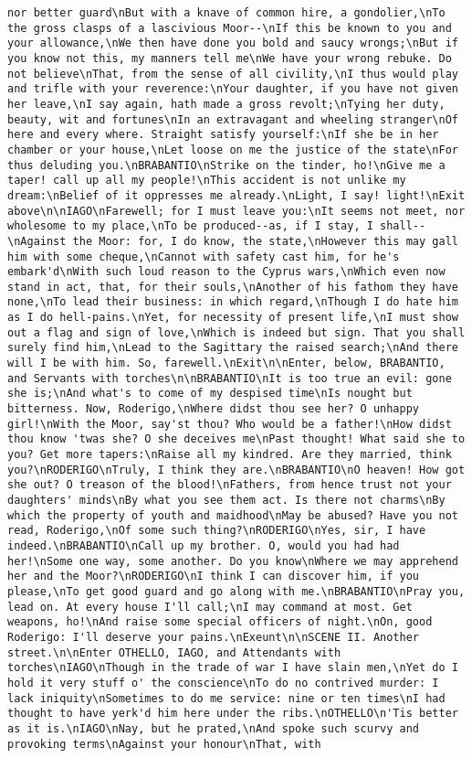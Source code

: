 \begin{verbatim}
nor better guard\nBut with a knave of common hire, a gondolier,\nTo the gross clasps of a lascivious Moor--\nIf this be known to you and your allowance,\nWe then have done you bold and saucy wrongs;\nBut if you know not this, my manners tell me\nWe have your wrong rebuke. Do not believe\nThat, from the sense of all civility,\nI thus would play and trifle with your reverence:\nYour daughter, if you have not given her leave,\nI say again, hath made a gross revolt;\nTying her duty, beauty, wit and fortunes\nIn an extravagant and wheeling stranger\nOf here and every where. Straight satisfy yourself:\nIf she be in her chamber or your house,\nLet loose on me the justice of the state\nFor thus deluding you.\nBRABANTIO\nStrike on the tinder, ho!\nGive me a taper! call up all my people!\nThis accident is not unlike my dream:\nBelief of it oppresses me already.\nLight, I say! light!\nExit above\n\nIAGO\nFarewell; for I must leave you:\nIt seems not meet, nor wholesome to my place,\nTo be produced--as, if I stay, I shall--\nAgainst the Moor: for, I do know, the state,\nHowever this may gall him with some cheque,\nCannot with safety cast him, for he's embark'd\nWith such loud reason to the Cyprus wars,\nWhich even now stand in act, that, for their souls,\nAnother of his fathom they have none,\nTo lead their business: in which regard,\nThough I do hate him as I do hell-pains.\nYet, for necessity of present life,\nI must show out a flag and sign of love,\nWhich is indeed but sign. That you shall surely find him,\nLead to the Sagittary the raised search;\nAnd there will I be with him. So, farewell.\nExit\n\nEnter, below, BRABANTIO, and Servants with torches\n\nBRABANTIO\nIt is too true an evil: gone she is;\nAnd what's to come of my despised time\nIs nought but bitterness. Now, Roderigo,\nWhere didst thou see her? O unhappy girl!\nWith the Moor, say'st thou? Who would be a father!\nHow didst thou know 'twas she? O she deceives me\nPast thought! What said she to you? Get more tapers:\nRaise all my kindred. Are they married, think you?\nRODERIGO\nTruly, I think they are.\nBRABANTIO\nO heaven! How got she out? O treason of the blood!\nFathers, from hence trust not your daughters' minds\nBy what you see them act. Is there not charms\nBy which the property of youth and maidhood\nMay be abused? Have you not read, Roderigo,\nOf some such thing?\nRODERIGO\nYes, sir, I have indeed.\nBRABANTIO\nCall up my brother. O, would you had had her!\nSome one way, some another. Do you know\nWhere we may apprehend her and the Moor?\nRODERIGO\nI think I can discover him, if you please,\nTo get good guard and go along with me.\nBRABANTIO\nPray you, lead on. At every house I'll call;\nI may command at most. Get weapons, ho!\nAnd raise some special officers of night.\nOn, good Roderigo: I'll deserve your pains.\nExeunt\n\nSCENE II. Another street.\n\nEnter OTHELLO, IAGO, and Attendants with torches\nIAGO\nThough in the trade of war I have slain men,\nYet do I hold it very stuff o' the conscience\nTo do no contrived murder: I lack iniquity\nSometimes to do me service: nine or ten times\nI had thought to have yerk'd him here under the ribs.\nOTHELLO\n'Tis better as it is.\nIAGO\nNay, but he prated,\nAnd spoke such scurvy and provoking terms\nAgainst your honour\nThat, with 
\end{verbatim}
